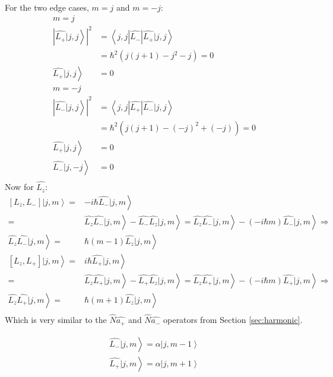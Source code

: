 			For the two edge cases, $m = j$ and $m = -j$:
			\begin{align}
				m = j& \\
				\left| \left. \hat{L_+} | j,j \right\rangle \right|^2 &= \left\langle j,j | \hat{L_-}| \hat{L_+} |j,j \right\rangle \\
				&= \hbar^2 \left( j(j+1) - j^2 - j\right) = 0 \\
				\left. \hat{L_+} | j,j \right\rangle &= 0 \\
				m = -j& \\
				\left| \left. \hat{L_-} | j,j \right\rangle \right|^2 &= \left\langle j,j | \hat{L_+}| \hat{L_-} |j,j \right\rangle \\
				&= \hbar^2 \left( j(j+1) - (-j)^2 + (-j)\right) = 0 \\
				\left. \hat{L_+} | j,j \right\rangle &= 0 \\			
				\left. \hat{L_-} | j,-j \right\rangle &= 0 \\			
			\end{align}
			Now for $\hat{L_z}$:
			\begin{align}
				\left.\left[L_z, L_-\right]|j,m\right\rangle =& \left.-i\hbar\hat{L_-}|j,m\right\rangle \\
				=& \left.\hat{L_z}\hat{L_-}|j,m\right\rangle - \left.\hat{L_-}\hat{L_z}|j,m\right\rangle = \left.\hat{L_z}\hat{L_-}|j,m\right\rangle - \left.(-i\hbar m)\hat{L_-}|j,m\right\rangle \Rightarrow \\
				\left.\hat{L_z}\hat{L_-}|j,m\right\rangle =& \left. \hbar(m-1)\hat{L_z}|j,m\right\rangle \\
				\left.\left[L_z, L_+\right]|j,m\right\rangle =& \left.i\hbar\hat{L_+}|j,m\right\rangle \\
				=& \left.\hat{L_z}\hat{L_+}|j,m\right\rangle - \left.\hat{L_+}\hat{L_z}|j,m\right\rangle = \left.\hat{L_z}\hat{L_+}|j,m\right\rangle - \left.(-i\hbar m)\hat{L_+}|j,m\right\rangle \Rightarrow \\			
				\left.\hat{L_z}\hat{L_+}|j,m\right\rangle =& \left. \hbar(m+1)\hat{L_z}|j,m\right\rangle \\			
			\end{align}
			Which is very similar to the $\hat{N}\hat{a_+}$ and $\hat{N}\hat{a_-}$ operators from Section \ref{sec:harmonic}.
			
			\begin{align}
				\left.\hat{L_-}|j,m\right\rangle = \left.\alpha|j,m-1\right\rangle \\
				\left.\hat{L_+}|j,m\right\rangle = \left.\alpha|j,m+1\right\rangle \\
			\end{align}
